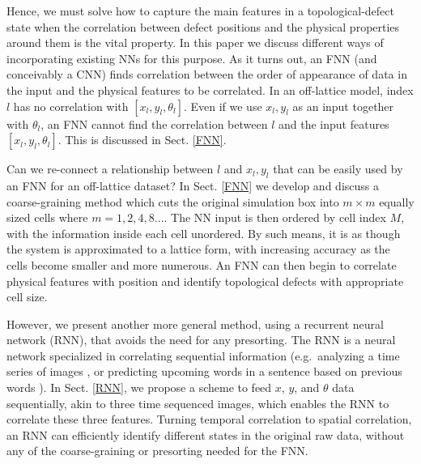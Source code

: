 Hence, we must solve how to capture the main features in a topological-defect state when the correlation between defect positions and the physical properties around them is the vital property. In this paper we discuss different ways of incorporating existing NNs for this purpose. As it turns out, an FNN (and conceivably a CNN) finds correlation between the order of appearance of data in the input and the physical features to be correlated. In an off-lattice model, index $l$ has no correlation with $[x_l,y_l, \theta_l]$. Even if we use $x_l, y_l$ as an input together with $\theta_l$, an FNN cannot find the correlation between $l$ and the input features $[x_l,y_l, \theta_l]$. This is discussed in Sect. \ref{FNN}.

Can we re-connect a relationship between $l$ and $x_l, y_l$ that can be easily used by an FNN for an off-lattice dataset? In Sect.
\ref{FNN} we develop and discuss a coarse-graining method which cuts the original simulation box into $m\times m$ equally sized cells where $m=1,2,4,8...$. The NN input is then ordered by cell index $M$, with the information inside each cell unordered. By such means, it is as though the system is approximated to a lattice form, with increasing accuracy as the cells become smaller and more numerous. An FNN can then begin to correlate physical features with position and identify topological defects with appropriate cell size.

However, we present another more general method, using a recurrent neural network (RNN), that avoids the need for any presorting.
The RNN is a neural network specialized in correlating sequential information (e.g.\ analyzing a time series of images \cite{rnnvideo}, or predicting upcoming words in a sentence based on previous words \cite{rnnwords1,rnnwords2}). In Sect. \ref{RNN}, we propose a scheme to feed
$x$, $y$, and $\theta$ data sequentially, akin to three time sequenced images, which enables the RNN to correlate these three features. Turning temporal correlation to spatial correlation, an RNN can efficiently identify different states in the original raw data, without any of the coarse-graining or presorting needed for the FNN.

